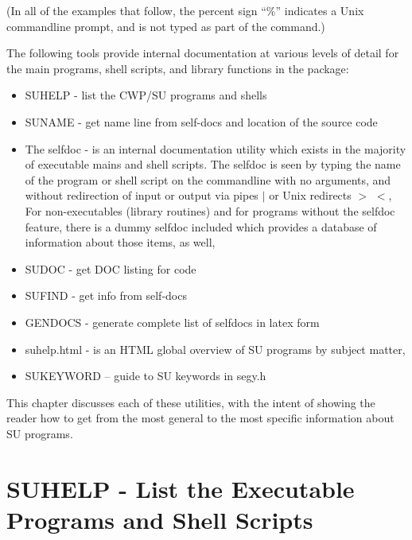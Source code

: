 (In all of the examples that follow, the percent sign ``\%''
indicates a Unix commandline prompt, and is not typed
as part of the command.)

The following tools provide internal documentation at various
levels of detail for the main programs, shell scripts, and
library functions in the package:

\begin{itemize}
\item SUHELP - list the CWP/SU programs and shells
\item SUNAME - get name line from self-docs and location of the source code
\item The selfdoc - is an internal documentation utility which exists
in the majority of executable mains and shell scripts. The selfdoc
is seen by typing the name of the program or shell script on the commandline
with no arguments, and without redirection of input or output via
pipes $|$ or Unix redirects $>$ $<$,
For non-executables (library routines) and for programs without the
selfdoc feature, there is a dummy selfdoc included which provides a
database of information about those items, as well,
\item SUDOC - get DOC listing for code 
\item SUFIND - get info from self-docs 
\item GENDOCS - generate complete list of selfdocs in latex form 
\item suhelp.html - is an HTML global overview of SU programs by subject
matter,
\item SUKEYWORD -- guide to SU keywords in segy.h 
\end{itemize}

This chapter discusses each of these utilities, with the intent
of showing the reader how to get from the most general to the
most specific information about SU programs.

\section{SUHELP - List the Executable Programs and Shell Scripts} 

